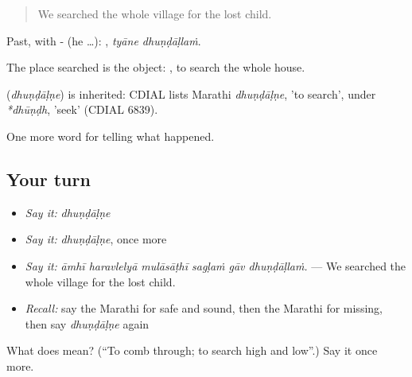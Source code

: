 \begin{quote}
We searched the whole village for the lost child.
\end{quote}

Past, with - (he …):  , \emph{tyāne dhuṇḍāḷlaṁ}.

The place searched is the object:  , to search the whole house.

\begin{cousinweb}
\textbf{} (\emph{dhuṇḍāḷṇe}) is inherited: CDIAL lists Marathi \emph{dhuṇḍāḷṇe}, 'to search', under \emph{*dhūṇḍh}, 'seek' (CDIAL 6839).
\end{cousinweb}

\begin{grammarlens}[title={What you've built}]
One more word for telling what happened.
\end{grammarlens}

\subsection*{Your turn}
\begin{itemize}
\raggedright
  \item \emph{Say it:} \emph{dhuṇḍāḷṇe}
  \item \emph{Say it:} \emph{dhuṇḍāḷṇe}, once more
  \item \emph{Say it:} \emph{āmhī haravlelyā mulāsāṭhī sagḷaṁ gāv dhuṇḍāḷlaṁ.} — We searched the whole village for the lost child.
  \item \emph{Recall:} say the Marathi for safe and sound, then the Marathi for missing, then say \emph{dhuṇḍāḷṇe} again
\end{itemize}

\begin{tcolorbox}[breakable,colback=teal!4,colframe=teal!35!black,title={Before you move on}]
What does  mean? (\textquotedblleft{}To comb through; to search high and low\textquotedblright{}.) Say it once more.
\end{tcolorbox}
